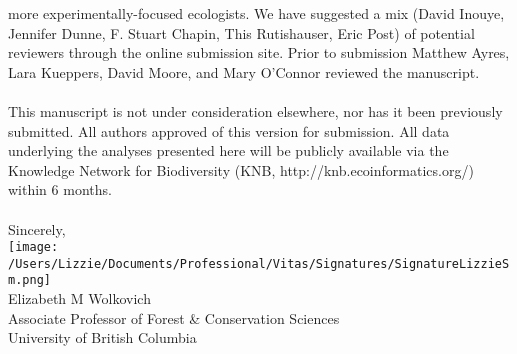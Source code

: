 \documentclass[11pt,a4paper]{article}
\begin{document}
more experimentally-focused ecologists.  We have suggested a mix (David Inouye, Jennifer Dunne, F. Stuart Chapin, This Rutishauser, Eric Post) of potential reviewers through the online submission site. Prior to submission Matthew Ayres, Lara Kueppers, David Moore, and Mary O'Connor reviewed the manuscript.\\
\vspace{1.5ex}\\
\noindent This manuscript is not under consideration elsewhere, nor has it been previously submitted. All authors approved of this version for submission. All data underlying the analyses presented here will be publicly available via the Knowledge Network for Biodiversity (KNB, http://knb.ecoinformatics.org/) within 6 months.\\
\vspace{1.5ex}\\
Sincerely,\\

\texttt{[image: /Users/Lizzie/Documents/Professional/Vitas/Signatures/SignatureLizzieSm.png]} \\

Elizabeth M Wolkovich\\
Associate Professor of Forest \& Conservation Sciences\\ 
University of British Columbia\\

\begin{footnotesize}

\end{footnotesize}
\end{document}
